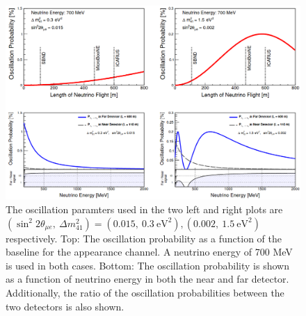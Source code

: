 \begin{figure}[h!]
    \centering
    \includegraphics[width = \largefigwidth]{figures-chap3/osc_probability.png}
    \caption[SBN oscillation probability.]{The oscillation paramters used in the two left and right plots are $(\sin^2{2\theta_{\mu e}}, ~\Delta m^2_{41}) = (0.015, ~0.3~\text{eV}^2), (0.002, ~1.5~\text{eV}^2)$ respectively. Top: The oscillation probability as a function of the baseline for the \nue appearance channel. A neutrino energy of 700 MeV is used in both cases. Bottom: The oscillation probability is shown as a function of neutrino energy in both the near and far detector. Additionally, the ratio of the oscillation probabilities between the two detectors is also shown. \cite{SBN_paper}}
    \label{fig:osc_probability}
\end{figure}

